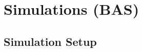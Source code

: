 \documentclass{article}
\begin{document}







\section{Simulations (BAS)}
\label{sec:simulations}

\subsection{Simulation Setup}
\end{document}
